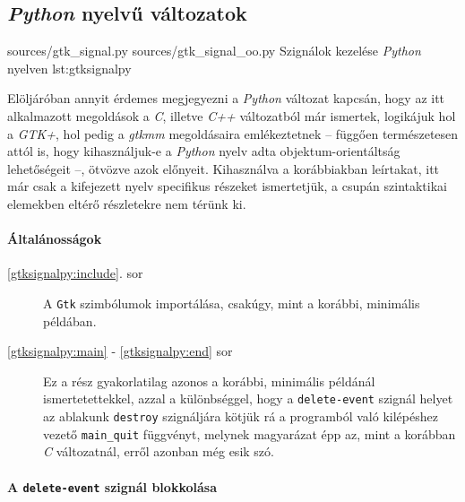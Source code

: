 \subsection{\textit{Python} nyelvű változatok}

\lstdoublepysource
{sources/gtk_signal.py}
{sources/gtk_signal_oo.py}
{Szignálok kezelése \textit{Python} nyelven}
{lst:gtksignalpy}


Elöljáróban annyit érdemes megjegyezni a \textit{Python} változat kapcsán, hogy az itt alkalmazott megoldások a \textit{C}, illetve \textit{C++} változatból már ismertek, logikájuk hol a \textit{GTK+}, hol pedig a \textit{gtkmm} megoldásaira emlékeztetnek -- függően természetesen attól is, hogy kihasználjuk-e a \textit{Python} nyelv adta objektum-orientáltság lehetőségeit --, ötvözve azok előnyeit. Kihasználva a korábbiakban leírtakat, itt már csak a kifejezett nyelv specifikus részeket ismertetjük, a csupán szintaktikai elemekben eltérő részletekre nem térünk ki.

\paragraph{Általánosságok}

\begin{description}
 \item[\ref{gtksignalpy:include}. sor] A \texttt{Gtk} szimbólumok importálása, csakúgy, mint a korábbi, minimális példában.

 \item[\ref{gtksignalpy:main} - \ref{gtksignalpy:end} sor] Ez a rész gyakorlatilag azonos a korábbi, minimális példánál ismertetettekkel, azzal a különbséggel, hogy a \texttt{delete-event} szignál helyet az ablakunk \texttt{destroy} szignáljára kötjük rá a programból való kilépéshez vezető \texttt{main\_quit} függvényt, melynek magyarázat épp az, mint a korábban \textit{C} változatnál, erről azonban még esik szó.

\end{description}

\paragraph{A \texttt{delete-event} szignál blokkolása}

